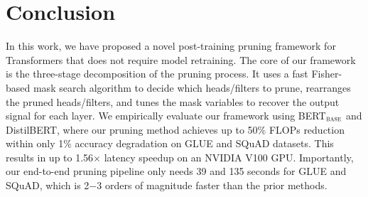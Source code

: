 \vspace{-5mm}
\section{Conclusion}
\label{sec:conclusion}
\vspace{-3mm}

In this work, we have proposed a novel post-training pruning framework for Transformers that does not require model retraining.
The core of our framework is the three-stage decomposition of the pruning process.
It uses a fast Fisher-based mask search algorithm to decide which heads/filters to prune, rearranges the pruned heads/filters, and tunes the mask variables to recover the output signal for each layer.
We empirically evaluate our framework using BERT$_\textsc{base}$ and DistilBERT, where our pruning method achieves up to 50\% FLOPs reduction within only 1\% accuracy degradation on GLUE and SQuAD datasets.
This results in up to 1.56$\times$ latency speedup on an NVIDIA V100 GPU.
Importantly, our end-to-end pruning pipeline only needs 39 and 135 seconds for GLUE and SQuAD, which is 2$-$3 orders of magnitude faster than the prior methods.
\vspace{-3mm}
